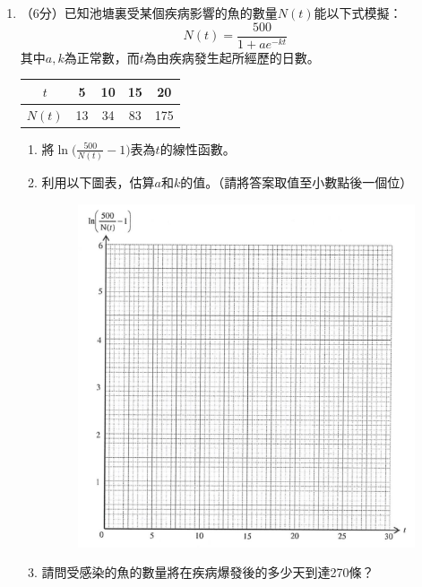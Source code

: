 \documentclass[12pt]{article}
\begin{document}
\begin{enumerate}
        \hrulefill
        \item （6分）已知池塘裏受某個疾病影響的魚的數量$N(t)$能以下式模擬：$$N(t)=\frac{500}{1+ae^{-kt}}$$其中$a,k$為正常數，而$t$為由疾病發生起所經歷的日數。
        \begin{center}
            \begin{tabular}{|c|c|c|c|c|}
                \hline
                $t$&5&10&15&20\\
                \hline
                $N(t)$&13&34&83&175\\
                \hline
            \end{tabular}
        \end{center}
        \begin{enumerate}
            \item 將$\displaystyle\ln\biggl(\frac{500}{N(t)}-1\biggr)$表為$t$的線性函數。
            \item 利用以下圖表，估算$a$和$k$的值。（請將答案取值至小數點後一個位）\begin{figure}[H]
                \centering
                \includegraphics[scale=0.75]{graph_paper.png}
            \end{figure}
            \item 請問受感染的魚的數量將在疾病爆發後的多少天到達270條？
        \end{enumerate}


\end{enumerate}
\end{document}
